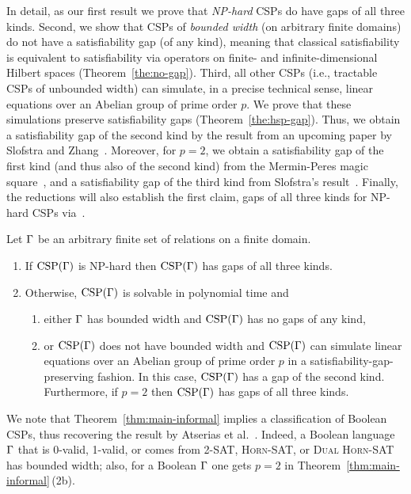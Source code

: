 In detail, as our first result we prove that 
\emph{NP-hard} CSPs do have gaps of all three kinds. Second, we show that CSPs of \emph{bounded width} (on arbitrary finite domains) do not have a
satisfiability gap (of any kind), meaning that classical satisfiability is
equivalent to satisfiability via operators on finite- and infinite-dimensional
Hilbert spaces (Theorem~\ref{the:no-gap}). Third, all other CSPs (i.e.,
tractable CSPs of unbounded width) can simulate, in a
precise technical sense, linear equations over an Abelian group of prime order
$p$. We prove that these simulations preserve
satisfiability gaps (Theorem~\ref{the:hsp-gap}).
Thus, we obtain a satisfiability
gap of the second kind by the result from an upcoming paper by Slofstra and
Zhang~\cite{SZ24:personal}.
Moreover, for $p=2$, we obtain a satisfiability
gap of the first kind (and thus also of the second kind) from the Mermin-Peres magic
square~\cite{Mermin1990simple,Mermin1993hidden,Peres1990incompatible}, and a 
satisfiability gap of the third kind from Slofstra's
result~\cite{Slofstra20:jams}. Finally, the reductions will also establish the
first claim, gaps of all three kinds for NP-hard CSPs
via~\cite{Mermin1990simple,Mermin1993hidden,Peres1990incompatible,Slofstra20:jams}.

\begin{theorem}\label{thm:main-informal}
  Let $\Gamma$ be an arbitrary finite set of relations on a finite domain. 
  \begin{enumerate}
  \item If ${\rm CSP}(\Gamma)$ is NP-hard then ${\rm CSP}(\Gamma)$ has gaps of all three kinds.
  \item Otherwise, ${\rm CSP}(\Gamma)$ is solvable in polynomial time and
  \begin{enumerate}
  \item either $\Gamma$ has bounded width and ${\rm CSP}(\Gamma)$ has no gaps of any kind,
  \item or ${\rm CSP}(\Gamma)$ does not have bounded width and ${\rm CSP}(\Gamma)$ can simulate linear equations over an Abelian
    group of prime order $p$ in a satisfiability-gap-preserving fashion. In this
    case, ${\rm CSP}(\Gamma)$ has a gap of the second kind. Furthermore, if $p=2$ then
    ${\rm CSP}(\Gamma)$ has gaps of all three kinds. 
  \end{enumerate} 
  \end{enumerate}
\end{theorem}

We note that Theorem~\ref{thm:main-informal} implies a classification of Boolean
CSPs, thus recovering the result by Atserias et al.~\cite{AKS19:jcss}. Indeed,
a Boolean language $\Gamma$ that is 0-valid, 1-valid, or comes from
\textsc{2-SAT}, \textsc{Horn-SAT}, or \textsc{Dual Horn-SAT} has bounded
width; also, for a Boolean $\Gamma$ one gets $p=2$ in
Theorem~\ref{thm:main-informal}\,(2b).

